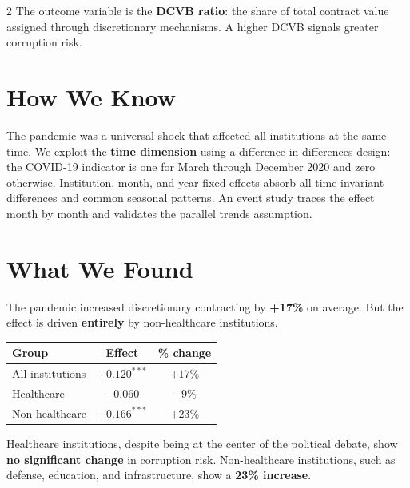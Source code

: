 \documentclass[9pt]{article}
\begin{document}
\begin{multicols}{2}
\vspace{0.4em}
The outcome variable is the \textbf{DCVB ratio}: the share of total
contract value assigned through discretionary mechanisms. A higher
DCVB signals greater corruption risk.

\section{How We Know}

The pandemic was a universal shock that affected all institutions at
the same time. We exploit the \textbf{time dimension} using a
difference-in-differences design: the COVID-19 indicator is one for
March through December 2020 and zero otherwise. Institution, month,
and year fixed effects absorb all time-invariant differences and common
seasonal patterns. An event study traces the effect month by month and
validates the parallel trends assumption.

\columnbreak

\section{What We Found}

The pandemic increased discretionary contracting by
\textbf{\textcolor{positivegreen}{+17\%}} on average. But the effect
is driven \textbf{entirely} by non-healthcare institutions.

\vspace{0.3em}
{\small\centering
\begin{tabular}{lcc}
  \toprule
  \textbf{Group} & \textbf{Effect} & \textbf{\% change} \\
  \midrule
  All institutions & \textcolor{positivegreen}{$+0.120^{***}$} & \textcolor{positivegreen}{$+17\%$} \\
  Healthcare       & $-0.060$ & $-9\%$ \\
  Non-healthcare   & \textcolor{positivegreen}{$+0.166^{***}$} & \textcolor{positivegreen}{$+23\%$} \\
  \bottomrule
\end{tabular}\par}

\vspace{0.4em}
Healthcare institutions, despite being at the center of the political
debate, show \textbf{no significant change} in corruption risk.
Non-healthcare institutions, such as defense, education, and
infrastructure, show a \textbf{23\% increase}.


\end{multicols}
\end{document}
